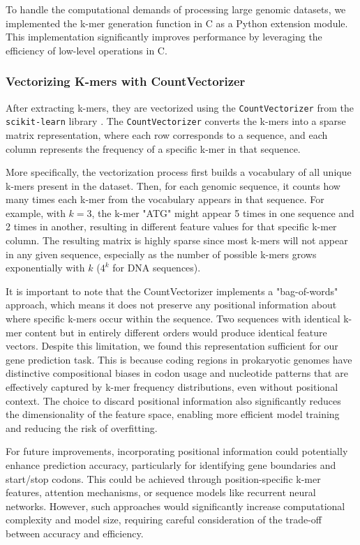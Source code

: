 \documentclass[
	a4paper, %
	10pt, %
	unnumberedsections, %
	twoside, %
]{LTJournalArticle}
\begin{document}
To handle the computational demands of processing large genomic datasets, we implemented the k-mer generation function in C as a Python extension module. This implementation significantly improves performance by leveraging the efficiency of low-level operations in C. 

\subsubsection{Vectorizing K-mers with CountVectorizer}

After extracting k-mers, they are vectorized using the \texttt{CountVectorizer} from the \texttt{scikit-learn} library \cite{Pedregosa:2011}. The \texttt{CountVectorizer} converts the k-mers into a sparse matrix representation, where each row corresponds to a sequence, and each column represents the frequency of a specific k-mer in that sequence. 

More specifically, the vectorization process first builds a vocabulary of all unique k-mers present in the dataset. Then, for each genomic sequence, it counts how many times 
each k-mer from the vocabulary appears in that sequence. For example, with \(k=3\), the k-mer "ATG" might appear 5 times in one sequence and 2 times in another, resulting in 
different feature values for that specific k-mer column. The resulting matrix is highly sparse since most k-mers will not appear in any given sequence, especially as the number 
of possible k-mers grows exponentially with \( k \) (\( 4^k \) for DNA sequences).

It is important to note that the CountVectorizer implements a "bag-of-words" approach, which means it does not preserve any positional information about where specific k-mers occur within the sequence. Two sequences with identical k-mer content but in entirely different orders would produce identical feature vectors. Despite this limitation, we found this representation sufficient for our gene prediction task. This is because coding regions in prokaryotic genomes have distinctive compositional biases in codon usage and nucleotide patterns that are effectively captured by k-mer frequency distributions, even without positional context. The choice to discard positional information also significantly reduces the dimensionality of the feature space, enabling more efficient model training and reducing the risk of overfitting.

For future improvements, incorporating positional information could potentially enhance prediction accuracy, particularly for identifying gene boundaries and start/stop codons. This could be achieved through position-specific k-mer features, attention mechanisms, or sequence models like recurrent neural networks. However, such approaches would significantly increase computational complexity and model size, requiring careful consideration of the trade-off between accuracy and efficiency.
\end{document}
